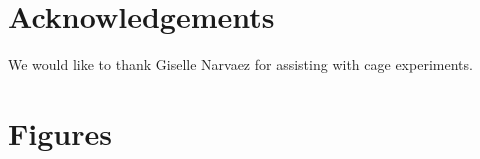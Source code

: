 \documentclass{bmcart}
\begin{document}
\begin{linenumbers}
\begin{backmatter}
\section*{Acknowledgements}
  We would like to thank Giselle Narvaez for assisting with cage experiments.
  




\newpage
\section*{Figures}


\end{backmatter}
\end{linenumbers}
\end{document}
